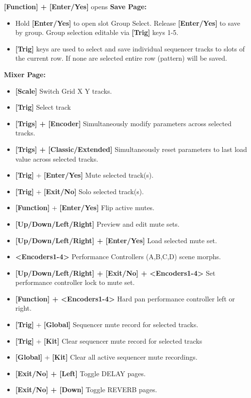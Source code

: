 \begin{itemize}
\textbf{[Function] + [Enter/Yes]} opens \textbf{Save Page:}
    \begin{itemize}
    \item Hold \textbf{[Enter/Yes]} to open slot Group Select. Release \textbf{[Enter/Yes]} to save by group.  Group selection editable via \textbf{[Trig]} keys 1-5.
    \item \textbf{[Trig]} keys are used to select and save individual sequencer tracks to slots of the current row. If none are selected entire row (pattern) will be saved.
    \end{itemize}
\end{itemize}

\textbf{Mixer Page:}
      \begin{itemize}
       \item \textbf{[Scale]} Switch Grid X Y tracks.
       \item \textbf{[Trig]} Select track
       \item \textbf{[Trigs] + [Encoder]} Simultaneously modify parameters across selected tracks. 
       \item \textbf{[Trigs] + [Classic/Extended]} Simultaneously reset parameters to last load value across selected tracks.
       \item \textbf{[Trig]} + \textbf{[Enter/Yes]} Mute selected track(s).
      \item \textbf{[Trig]} + \textbf{[Exit/No]} Solo selected track(s).
      \item \textbf{[Function]} + \textbf{[Enter/Yes]} Flip active mutes.
      \item \textbf{[Up/Down/Left/Right]} Preview and edit mute sets.
      \item \textbf{[Up/Down/Left/Right] + [Enter/Yes]} Load selected mute set.
      \item \textbf{<Encoders1-4>} Performance Controllers (A,B,C,D) scene morphs.
      \item \textbf{[Up/Down/Left/Right] + [Exit/No] + <Encoders1-4>} Set performance controller lock to mute set.
      \item \textbf{[Function] + <Encoders1-4>} Hard pan performance controller left or right.
      \item \textbf{[Trig]} + \textbf{[Global]} Sequencer mute record for selected tracks.
      \item \textbf{[Trig]} + \textbf{[Kit]} Clear sequencer mute record for selected tracks
      \item \textbf{[Global]} + \textbf{[Kit]} Clear all active sequencer mute recordings.
      \item \textbf{[Exit/No] + [Left]} Toggle DELAY pages.
      \item \textbf{[Exit/No] + [Down]} Toggle REVERB pages.
       \end{itemize}
